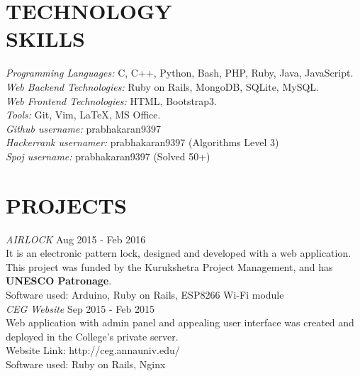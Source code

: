 \documentclass[margin, 10pt]{res} %
\begin{document}
\begin{resume}

\section{TECHNOLOGY \\ SKILLS} 

{\sl Programming Languages:} C, C++, Python, Bash, PHP, Ruby, Java, JavaScript. \\
{\sl Web Backend Technologies:} Ruby on Rails, MongoDB, SQLite, MySQL. \\
{\sl Web Frontend Technologies:} HTML, Bootstrap3. \\
{\sl Tools:} Git, Vim, LaTeX, MS Office. \\
{\sl Github username:} prabhakaran9397 \\
{\sl Hackerrank usernamer:} prabhakaran9397 (Algorithms Level 3) \\
{\sl Spoj username:} prabhakaran9397 (Solved 50+) \\
 
 
\section{PROJECTS}

{\sl AIRLOCK} \hfill Aug 2015 - Feb 2016 \\
It is an electronic pattern lock, designed and developed with a web application. This project was funded by the Kurukshetra Project Management, and has \textbf{UNESCO Patronage}.\\ 
Software used: Arduino, Ruby on Rails, ESP8266 Wi-Fi module \\

{\sl CEG Website} \hfill Sep 2015 - Feb 2015 \\
Web application with admin panel and appealing user interface was created and deployed in the College's private server. \\
Website Link: http://ceg.annauniv.edu/ \\
Software used: Ruby on Rails, Nginx \\


\end{resume}
\end{document}
